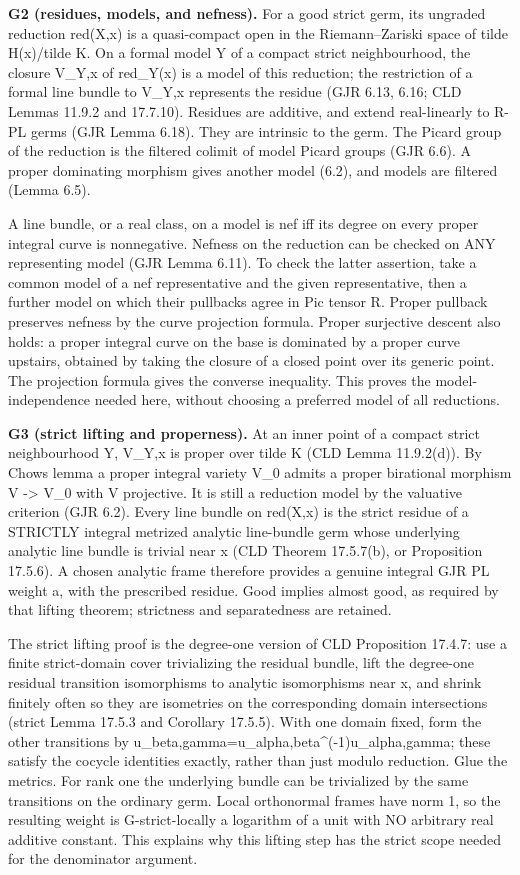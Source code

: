 \documentclass[
  11pt,
]{article}
\begin{document}
\textbf{G2 (residues, models, and nefness).} For a good strict germ, its
ungraded reduction red(X,x) is a quasi-compact open in the
Riemann--Zariski space of tilde H(x)/tilde K. On a formal model Y of a
compact strict neighbourhood, the closure V\_Y,x of red\_Y(x) is a model
of this reduction; the restriction of a formal line bundle to V\_Y,x
represents the residue (GJR 6.13, 6.16; CLD Lemmas 11.9.2 and 17.7.10).
Residues are additive, and extend real-linearly to R-PL germs (GJR Lemma
6.18). They are intrinsic to the germ. The Picard group of the reduction
is the filtered colimit of model Picard groups (GJR 6.6). A proper
dominating morphism gives another model (6.2), and models are filtered
(Lemma 6.5).

A line bundle, or a real class, on a model is nef iff its degree on
every proper integral curve is nonnegative. Nefness on the reduction can
be checked on ANY representing model (GJR Lemma 6.11). To check the
latter assertion, take a common model of a nef representative and the
given representative, then a further model on which their pullbacks
agree in Pic tensor R. Proper pullback preserves nefness by the curve
projection formula. Proper surjective descent also holds: a proper
integral curve on the base is dominated by a proper curve upstairs,
obtained by taking the closure of a closed point over its generic point.
The projection formula gives the converse inequality. This proves the
model-independence needed here, without choosing a preferred model of
all reductions.

\textbf{G3 (strict lifting and properness).} At an inner point of a
compact strict neighbourhood Y, V\_Y,x is proper over tilde K (CLD Lemma
11.9.2(d)). By Chow\textquotesingle s lemma a proper integral variety
V\_0 admits a proper birational morphism V -\textgreater{} V\_0 with V
projective. It is still a reduction model by the valuative criterion
(GJR 6.2). Every line bundle on red(X,x) is the strict residue of a
STRICTLY integral metrized analytic line-bundle germ whose underlying
analytic line bundle is trivial near x (CLD Theorem 17.5.7(b), or
Proposition 17.5.6). A chosen analytic frame therefore provides a
genuine integral GJR PL weight a, with the prescribed residue. Good
implies almost good, as required by that lifting theorem; strictness and
separatedness are retained.

The strict lifting proof is the degree-one version of CLD Proposition
17.4.7: use a finite strict-domain cover trivializing the residual
bundle, lift the degree-one residual transition isomorphisms to analytic
isomorphisms near x, and shrink finitely often so they are isometries on
the corresponding domain intersections (strict Lemma 17.5.3 and
Corollary 17.5.5). With one domain fixed, form the other transitions by
u\_beta,gamma=u\_alpha,beta\^{}(-1)u\_alpha,gamma; these satisfy the
cocycle identities exactly, rather than just modulo reduction. Glue the
metrics. For rank one the underlying bundle can be trivialized by the
same transitions on the ordinary germ. Local orthonormal frames have
norm 1, so the resulting weight is G-strict-locally a logarithm of a
unit with NO arbitrary real additive constant. This explains why this
lifting step has the strict scope needed for the denominator argument.
\end{document}
